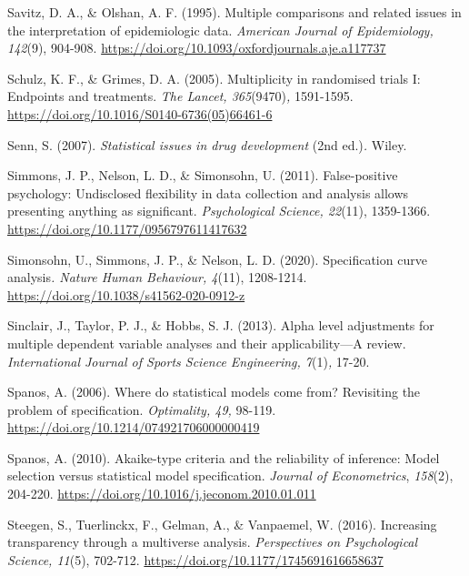 \documentclass[authordate, empirical]{jote-new-article}
\begin{document}
	Savitz, D. A., \& Olshan, A. F. (1995). Multiple comparisons and related issues in the interpretation of epidemiologic data. \emph{American Journal of Epidemiology, 142}(9), 904-908. \href{https://doi.org/10.1093/oxfordjournals.aje.a117737}{https://doi.org/10.1093/oxfordjournals.aje.a117737}



	Schulz, K. F., \& Grimes, D. A. (2005). Multiplicity in randomised trials I: Endpoints and treatments. \emph{The Lancet, 365}(9470)\emph{,} 1591-1595. \href{https://doi.org/10.1016/S0140-6736(05)66461-6}{https://doi.org/10.1016/S0140-6736(05)66461-6}



	Senn, S. (2007). \emph{Statistical issues in drug development }(2nd ed.)\emph{.} Wiley.



	Simmons, J. P., Nelson, L. D., \& Simonsohn, U. (2011). False-positive psychology: Undisclosed flexibility in data collection and analysis allows presenting anything as significant. \emph{Psychological Science, 22}(11), 1359-1366. \href{https://doi.org/10.1177/0956797611417632}{https://doi.org/10.1177/0956797611417632}



	Simonsohn, U., Simmons, J. P., \& Nelson, L. D. (2020). Specification curve analysis\emph{. Nature Human Behaviour, 4}(11), 1208-1214. \href{https://doi.org/10.1038/s41562-020-0912-z}{https://doi.org/10.1038/s41562-020-0912-z}



	Sinclair, J., Taylor, P. J., \& Hobbs, S. J. (2013). Alpha level adjustments for multiple dependent variable analyses and their applicability—A review. \emph{International Journal of Sports Science Engineering, 7}(1)\emph{,} 17-20.



	Spanos, A. (2006). Where do statistical models come from? Revisiting the problem of specification. \emph{Optimality, 49,} 98-119. \href{https://doi.org/10.1214/074921706000000419}{https://doi.org/10.1214/074921706000000419}



	Spanos, A. (2010). Akaike-type criteria and the reliability of inference: Model selection versus statistical model specification. \emph{Journal of Econometrics}, \emph{158}(2), 204-220. \href{https://doi.org/10.1016/j.jeconom.2010.01.011}{https://doi.org/10.1016/j.jeconom.2010.01.011}



	Steegen, S., Tuerlinckx, F., Gelman, A., \& Vanpaemel, W. (2016). Increasing transparency through a multiverse analysis. \emph{Perspectives on Psychological Science, 11}(5), 702-712. \href{https://doi.org/10.1177/1745691616658637}{https://doi.org/10.1177/1745691616658637}
\end{document}
